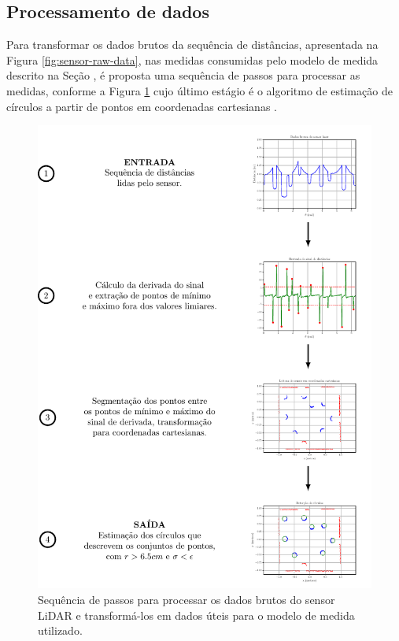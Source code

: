 \subsection{Processamento de dados}
Para transformar os dados brutos da sequência de distâncias, apresentada na Figura 
\ref{fig:sensor-raw-data}, nas medidas consumidas pelo modelo de medida 
descrito na Seção \emph{}, é proposta uma sequência de passos para processar as medidas, conforme a Figura \ref{fig:lidar-data-processing-pipeline} cujo último estágio é o 
algoritmo de estimação de círculos a partir de pontos em coordenadas 
cartesianas \cite[p.~903]{al2009error}.

\begin{figure}[]
  \includegraphics[width=\textwidth]{figs/data_processing_pipeline.pdf}
  \caption[Sequencia de passos de processamento do dado bruto do sensor LiDAR]{Sequência de passos para processar os dados brutos do sensor LiDAR e
  transformá-los em dados úteis para o modelo de medida utilizado.}
  \label{fig:lidar-data-processing-pipeline}
\end{figure}

